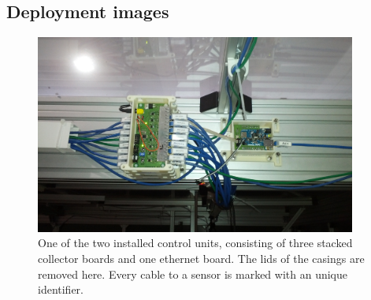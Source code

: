 \documentclass[a4paper]{scrreprt}
\begin{document}
\begin{appendices}
\chapter{Deployment images}
\begin{figure}[Hh!]
	\centering
	\includegraphics[width=0.94\textwidth]{img/control_unit.jpg}
	\caption{One of the two installed control units, consisting of three stacked collector boards and one ethernet board. The lids of the casings are removed here. Every cable to a sensor is marked with an unique identifier.}
	\label{fig:control_unit} %
\end{figure}
\end{appendices}
\end{document}
